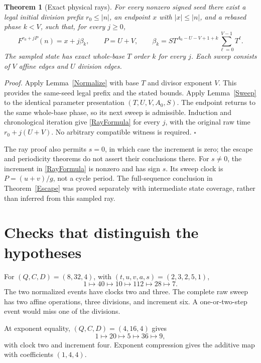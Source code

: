 \documentclass[11pt,letterpaper]{article}
\newtheorem{theorem}{Theorem}
\newenvironment{proof}{\noindent\textit{Proof.}}{\hfill\(\square\)}
\begin{document}
\begin{theorem}[Exact physical rays]\label{Ray}
For every nonzero signed seed there exist a legal initial division prefix
\(r_0\le |n|\), an endpoint \(x\) with \(|x|\le |n|\), and a rebased phase
\(k<V\), such that, for every \(j\ge0\),
\begin{equation}\label{RayFormula}
F^{r_0+jP}(n)=x+j\beta_k,\qquad
P=U+V,\qquad
\beta_k=S T^{A_0-U-V+1+k}\sum_{\ell=0}^{V-1}T^\ell .
\end{equation}
The sampled state has exact whole-base \(T\) order \(k\) for every \(j\).
Each sweep consists of \(V\) affine edges and \(U\) division edges.
\end{theorem}
\begin{proof}
Apply Lemma~\ref{Normalize} with base \(T\) and divisor exponent \(V\).
This provides the same-seed legal prefix and the stated bounds.
Apply Lemma~\ref{Sweep} to the identical parameter presentation
\((T,U,V,A_0,S)\). The endpoint returns to the same whole-base phase,
so its next sweep is admissible. Induction and chronological iteration
give \eqref{RayFormula} for every \(j\), with the original raw time
\(r_0+j(U+V)\). No arbitrary compatible witness is required.
\end{proof}

The ray proof also permits \(s=0\), in which case the increment is zero;
the escape and periodicity theorems do not assert their conclusions there.
For \(s\ne0\), the increment in \eqref{RayFormula} is nonzero and has sign \(s\).
Its sweep clock is \(P=(u+v)/g\), not a cycle period. The full-sequence
conclusion in Theorem~\ref{Escape} was proved separately with intermediate
state coverage, rather than inferred from this sampled ray.

\section{Checks that distinguish the hypotheses}

For \((Q,C,D)=(8,32,4)\), with \((t,u,v,a,s)=(2,3,2,5,1)\),
\[
1\longmapsto40\longmapsto10\longmapsto112\longmapsto28\longmapsto7.
\]
The two normalized events have clocks two and three. The complete raw
sweep has two affine operations, three divisions, and increment six.
A one-or-two-step event would miss one of the divisions.

At exponent equality, \((Q,C,D)=(4,16,4)\) gives
\[
1\longmapsto20\longmapsto5\longmapsto36\longmapsto9,
\]
with clock two and increment four. Exponent compression gives the
additive map with coefficients \((1,4,4)\).
\end{document}
